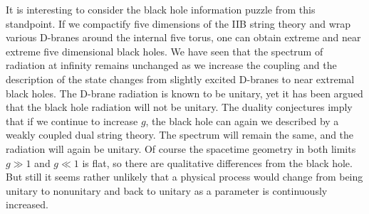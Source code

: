 It is interesting to consider the black hole information puzzle 
 from this standpoint. If we compactify five dimensions of the IIB string theory
and wrap various D-branes around the internal five torus, one can obtain
extreme and near extreme five dimensional black holes.
We have seen that the spectrum of radiation at infinity
remains unchanged as we
increase the coupling and the description of the state changes from
slightly excited D-branes to near extremal black holes.
The D-brane radiation
is known to be unitary, yet it has been argued that the black hole
radiation will not be unitary. The duality conjectures imply that
if we continue to increase $g$,
the black hole can again we described by a weakly coupled dual string
theory. The spectrum will remain the same, and the radiation will again be
unitary. Of course the spacetime geometry in both limits $g\gg 1$ and
$g \ll 1$ is flat, so there are qualitative differences from the black hole.
But
still it seems rather unlikely that a physical process would change from
being unitary to nonunitary and back to unitary as a parameter is continuously
increased.


